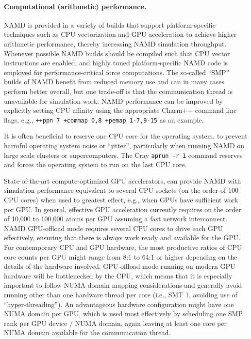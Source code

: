 \paragraph{Computational (arithmetic) performance.}
NAMD is provided in a variety of builds that support platform-specific
techniques such as CPU vectorization and GPU acceleration 
to achieve higher arithmetic performance, thereby increasing 
NAMD simulation throughput.  
Whenever possible NAMD builds should be compiled such that 
CPU vector instructions are enabled, and highly tuned
platform-specific NAMD code is employed for performance-critical 
force computations.
The so-called ``SMP'' builds of NAMD benefit from reduced memory use 
and can in many cases perform better overall, but one trade-off 
is that the communication thread is unavailable for simulation work.
NAMD performance can be improved by explicitly setting CPU affinity
using the appropriate Charm++ command line flags, e.g., 
\texttt{++ppn 7 +commap 0,8 +pemap 1-7,9-15} as an example.

It is often beneficial to reserve one CPU core for the 
operating system, to prevent harmful operating system noise or ``jitter'',
particularly when running NAMD on large scale clusters or supercomputers.
The Cray \texttt{aprun -r 1} command reserves and
forces the operating system to run on the last CPU core.

State-of-the-art compute-optimized GPU accelerators, 
can provide NAMD with simulation performance equivalent to 
several CPU sockets (on the order of 100 CPU cores) when used to 
greatest effect, e.g., when GPUs have sufficient work per GPU.
In general, effective GPU acceleration currently requires on the order
of 10,000 to 100,000 atoms per GPU assuming a fast network interconnect.
NAMD GPU-offload mode requires several CPU cores to drive each GPU effectively,
ensuring that there is always work ready and available for the GPU.
For contemporary CPU and GPU hardware, the most productive ratios of 
CPU core counts per GPU might range from 8:1 to 64:1 or higher depending on
the details of the hardware involved.
GPU-offload mode running on modern GPU hardware will be
bottlenecked by the CPU, which means that it is especially important
to follow NUMA domain mapping considerations and generally avoid
running other than one hardware thread per core
(i.e., SMT 1, avoiding use of ``hyper-threading'').
An advantageous hardware configuration might have one NUMA domain
per GPU, which is used most effectively by scheduling one
SMP rank per GPU device / NUMA domain, again leaving at least
one core per NUMA domain available for the communication thread.


